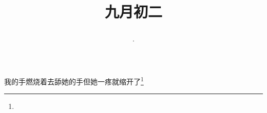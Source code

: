 \title{\date[d=4,m=10,y=2024][year:cn-y,年,month:cn,day:cn,日,·,weekday]·九月初二 }
我的手燃烧着去舔她的手但她一疼就缩开了\footnote{ }

